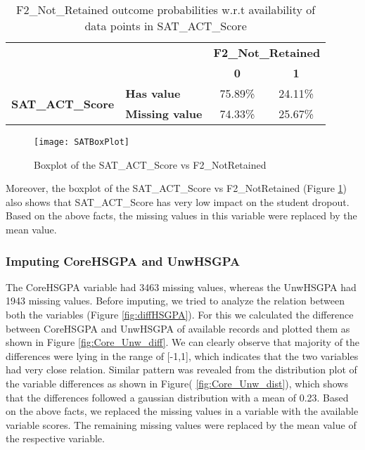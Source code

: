 \documentclass[11pt,openright]{report}
\begin{document}
\begin{table}[!t]
	\renewcommand{\arraystretch}{1.3}
	\caption{F2\_Not\_Retained outcome probabilities w.r.t availability of data points  in SAT\_ACT\_Score}
	\label{table:sat_act_db}
	\centering
	\begin{tabular}{|c|l|c|c|}
    \hline
    \multicolumn{2}{|c|}{} & \multicolumn{2}{|c|}{ \bfseries F2\_Not\_Retained }\\ \cline{3-4}
      \multicolumn{2}{|c|}{} & \bfseries 0 & \bfseries 1\\ \hline
     \multirow{2}{*}{ \bfseries SAT\_ACT\_Score}   &  \bfseries Has value & 75.89\% & 24.11\% \\ \cline{2-4}
     & \bfseries Missing value & 74.33\% & 25.67\%\\
    \hline

\end{tabular}
\end{table}


\begin{figure}[!htbp]
	\centering
	\texttt{[image: SATBoxPlot]}
	\caption{Boxplot of the SAT\_ACT\_Score vs F2\_NotRetained}
	\label{fig:Sat_F2NotRetained_plot}
\end{figure}

Moreover, the boxplot of the SAT\_ACT\_Score vs F2\_NotRetained (Figure \ref{fig:Sat_F2NotRetained_plot}) also shows that SAT\_ACT\_Score has very low impact on the student dropout. Based on the above facts, the missing values in this variable were replaced by the mean value. 

\subsubsection {Imputing CoreHSGPA and UnwHSGPA}
The CoreHSGPA variable had 3463 missing values, whereas the UnwHSGPA had 1943 missing values. Before imputing, we tried to analyze the relation between both the variables (Figure \ref{fig:diffHSGPA}). For this we calculated the difference between CoreHSGPA and UnwHSGPA of available records and plotted them as shown in Figure \ref{fig:Core_Unw_diff}. We can clearly observe that majority of the differences were lying in the range of [-1,1], which indicates that the two variables had very close relation. Similar pattern was revealed from the distribution plot of the variable differences as shown in Figure( \ref{fig:Core_Unw_dist}), which shows that the differences followed a gaussian distribution with a mean of 0.23. Based on the above facts, we replaced the missing values in a variable with the available variable scores. The remaining missing values were replaced by the mean value of the respective variable.
\end{document}

